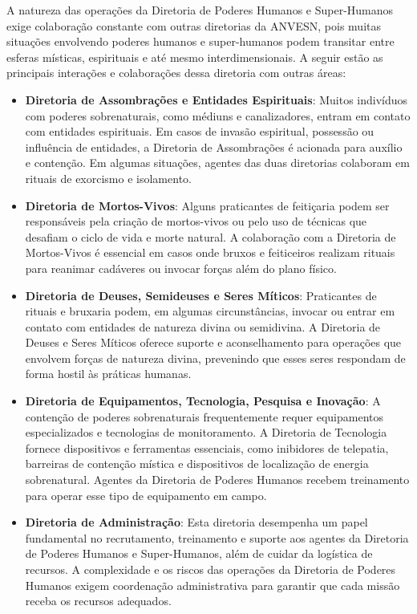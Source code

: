 A natureza das operações da Diretoria de Poderes Humanos e Super-Humanos exige colaboração constante com outras diretorias da ANVESN, pois muitas situações envolvendo poderes humanos e super-humanos podem transitar entre esferas místicas, espirituais e até mesmo interdimensionais. A seguir estão as principais interações e colaborações dessa diretoria com outras áreas:

\begin{itemize}
    \item \textbf{Diretoria de Assombrações e Entidades Espirituais}: Muitos indivíduos com poderes sobrenaturais, como médiuns e canalizadores, entram em contato com entidades espirituais. Em casos de invasão espiritual, possessão ou influência de entidades, a Diretoria de Assombrações é acionada para auxílio e contenção. Em algumas situações, agentes das duas diretorias colaboram em rituais de exorcismo e isolamento.
    \item \textbf{Diretoria de Mortos-Vivos}: Alguns praticantes de feitiçaria podem ser responsáveis pela criação de mortos-vivos ou pelo uso de técnicas que desafiam o ciclo de vida e morte natural. A colaboração com a Diretoria de Mortos-Vivos é essencial em casos onde bruxos e feiticeiros realizam rituais para reanimar cadáveres ou invocar forças além do plano físico.
    \item \textbf{Diretoria de Deuses, Semideuses e Seres Míticos}: Praticantes de rituais e bruxaria podem, em algumas circunstâncias, invocar ou entrar em contato com entidades de natureza divina ou semidivina. A Diretoria de Deuses e Seres Míticos oferece suporte e aconselhamento para operações que envolvem forças de natureza divina, prevenindo que esses seres respondam de forma hostil às práticas humanas.
    \item \textbf{Diretoria de Equipamentos, Tecnologia, Pesquisa e Inovação}: A contenção de poderes sobrenaturais frequentemente requer equipamentos especializados e tecnologias de monitoramento. A Diretoria de Tecnologia fornece dispositivos e ferramentas essenciais, como inibidores de telepatia, barreiras de contenção mística e dispositivos de localização de energia sobrenatural. Agentes da Diretoria de Poderes Humanos recebem treinamento para operar esse tipo de equipamento em campo.
    \item \textbf{Diretoria de Administração}: Esta diretoria desempenha um papel fundamental no recrutamento, treinamento e suporte aos agentes da Diretoria de Poderes Humanos e Super-Humanos, além de cuidar da logística de recursos. A complexidade e os riscos das operações da Diretoria de Poderes Humanos exigem coordenação administrativa para garantir que cada missão receba os recursos adequados.
\end{itemize}

